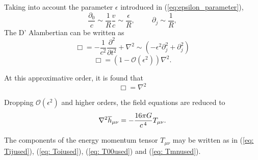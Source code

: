 Taking into account the parameter $\epsilon$ introduced in (\ref{eq:epsilon_parameter}),
\begin{equation}
  \frac{\partial_0}{c} \sim \frac{1}{R}\frac{v}{c} \sim \frac{\epsilon}{R}, \hspace{1cm} \partial_{j} \sim \frac{1}{R},
  \label{eq:aproxderivatives}
\end{equation}
The D' Alambertian can be written as
\begin{equation}
  \Box = -\frac{1}{c^2}\frac{\partial^2}{\partial t^2} + \nabla^2 \sim (-\epsilon ^2 \partial_j^2 + \partial_j^2)
\end{equation}
\begin{equation}
  \Box = (1-\mathcal{O}(\epsilon ^2))\nabla^2.
\end{equation}

At this approximative order, it is found that
\begin{equation}
  \Box = \nabla^2 
\end{equation}


Dropping  $\mathcal{O}(\epsilon^2)$  and higher orders, the field equations are reduced to
\begin{equation}
   \nabla^2 \overline{h}_{\mu \nu} = - \frac{16\pi G}{c^{\hspace{0.05cm}4}} T_{\mu \nu}.
\end{equation}

The components of the energy momentum tensor $T_{\mu \nu}$ may be written as in (\ref{eq: Tijused}), (\ref{eq: Toiused}), (\ref{eq: T00used}) and (\ref{eq: Tmnused}).\\


